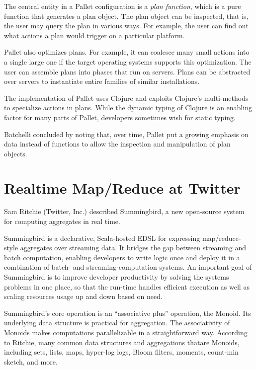 \documentclass{jfp1}
\begin{document}
The central entity in a Pallet configuration is a \textit{plan function},
which is a pure function that generates a plan object.  The plan object
can be inspected, that is, the user may query the plan in various
ways. For example, the user can find out what actions a plan would trigger
on a particular platform.

Pallet also optimizes plans.  For example, it can coalesce many small
actions into a single large one if the target operating systems supports
this optimization.  The user can assemble plans into phases that run on
servers. Plans can be abstracted over servers to instantiate entire
families of similar installations.

The implementation of Pallet uses Clojure and exploits Clojure's
multi-methods to specialize actions in plans. While the dynamic typing of
Clojure is an enabling factor for many parts of Pallet, developers
sometimes wish for static typing.

Batchelli concluded by noting that, over time, Pallet put a growing
emphasis on data instead of functions to allow the inspection and
manipulation of plan objects.


\section{Realtime Map/Reduce at Twitter}


Sam Ritchie (Twitter, Inc.) described Summingbird, a new open-source
system for computing aggregates in real time.

Summingbird is a declarative, Scala-hosted EDSL for expressing
map/reduce-style aggregates over streaming data. It bridges the gap
between streaming and batch computation, enabling developers to write
logic once and deploy it in a combination of batch- and
streaming-computation systems. An important goal of Summingbird is to
improve developer productivity by solving the systems problems in one
place, so that the run-time handles efficient execution as well as scaling
resources usage up and down based on need.

Summingbird's core operation is an ``associative plus'' operation, the
Monoid. Its underlying data structure is practical for aggregation. The
associativity of Monoids makes computations parallelizable in a
straightforward way. According to Ritchie, many common data structures and
aggregations thatare Monoids, including sets, lists, maps, hyper-log logs,
Bloom filters, moments, count-min sketch, and more. 
\end{document}
